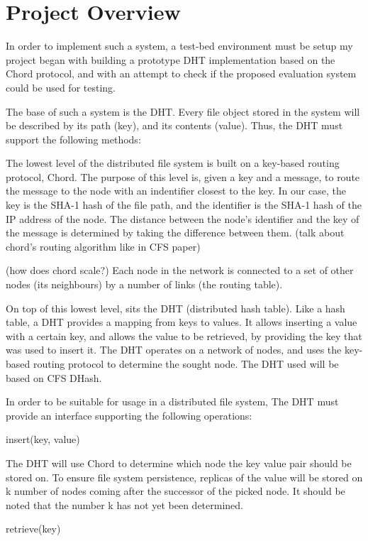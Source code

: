 \documentclass[a4paper, 11pt]{article}
\begin{document}
\section{Project Overview}

In order to implement such a system, a test-bed environment must be setup
my project began with building a prototype 
DHT implementation based on the Chord protocol, and with an attempt to check if
the proposed evaluation system could be used for testing.

The base of such a system is the DHT. Every file object stored in the system will be described by its path (key),
and its contents (value). Thus, the DHT must support the following methods: 


The lowest level of the distributed file system is built on a key-based routing protocol, Chord. The purpose of this level is, given a key and a message, to route the message to the node with an indentifier closest to the key. In our case, the key is the SHA-1 hash of the file path, and the identifier is the SHA-1 hash of the IP address of the node. The distance between the node's identifier and the key of the message is determined by taking the difference between them. (talk about chord's routing algorithm like in CFS paper)

(how does chord scale?)
Each node in the network is connected to a set of other nodes (its neighbours) by a number of links (the routing table).

On top of this lowest level, sits the DHT (distributed hash table). Like a hash table, a DHT provides a mapping from keys to values. It allows inserting a value with a certain key, and allows the value to be retrieved, by providing the key that was used to insert it. The DHT operates on a network of nodes, and uses the key-based routing protocol to determine the sought node. The DHT used will be based on CFS DHash.

In order to be suitable for usage in a distributed file system, The DHT must provide an interface supporting the following operations:

insert(key, value)

The DHT will use Chord to determine which node the key value pair should be stored on. To ensure file system persistence, replicas of the value will be stored on k number of nodes coming after the successor of the picked node. It should be noted that the number k has not yet been determined. 

retrieve(key)
\end{document}
